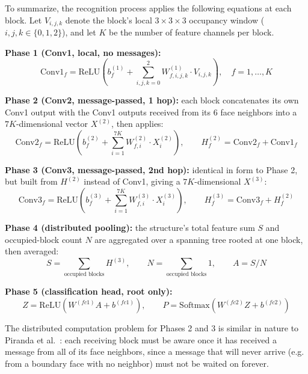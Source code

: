 \documentclass[12pt,a4paper]{report}
\begin{document}
To summarize, the recognition process applies the following equations at each block. Let $V_{i,j,k}$ denote the block's local $3\times3\times3$ occupancy window ($i,j,k \in \{0,1,2\}$), and let $K$ be the number of feature channels per block.

\textbf{Phase 1 (Conv1, local, no messages):}
\begin{equation}
\text{Conv1}_f = \mathrm{ReLU}\left(b^{(1)}_f + \sum_{i,j,k=0}^{2} W^{(1)}_{f,i,j,k} \cdot V_{i,j,k}\right), \quad f = 1,\dots,K
\label{eq:conv1}
\end{equation}

\textbf{Phase 2 (Conv2, message-passed, 1 hop):} each block concatenates its own Conv1 output with the Conv1 outputs received from its 6 face neighbors into a $7K$-dimensional vector $X^{(2)}$, then applies:
\begin{equation}
\text{Conv2}_f = \mathrm{ReLU}\left(b^{(2)}_f + \sum_{i=1}^{7K} W^{(2)}_{f,i} \cdot X^{(2)}_i\right), \qquad H^{(2)}_f = \text{Conv2}_f + \text{Conv1}_f
\label{eq:conv2}
\end{equation}

\textbf{Phase 3 (Conv3, message-passed, 2nd hop):} identical in form to Phase 2, but built from $H^{(2)}$ instead of Conv1, giving a $7K$-dimensional $X^{(3)}$:
\begin{equation}
\text{Conv3}_f = \mathrm{ReLU}\left(b^{(3)}_f + \sum_{i=1}^{7K} W^{(3)}_{f,i} \cdot X^{(3)}_i\right), \qquad H^{(3)}_f = \text{Conv3}_f + H^{(2)}_f
\label{eq:conv3}
\end{equation}

\textbf{Phase 4 (distributed pooling):} the structure's total feature sum $S$ and occupied-block count $N$ are aggregated over a spanning tree rooted at one block, then averaged:
\begin{equation}
S = \sum_{\text{occupied blocks}} H^{(3)}, \qquad N = \sum_{\text{occupied blocks}} 1, \qquad A = S / N
\label{eq:pool}
\end{equation}

\textbf{Phase 5 (classification head, root only):}
\begin{equation}
Z = \mathrm{ReLU}(W^{(fc1)} A + b^{(fc1)}), \qquad P = \mathrm{Softmax}(W^{(fc2)} Z + b^{(fc2)})
\label{eq:fc}
\end{equation}

The distributed computation problem for Phases 2 and 3 is similar in nature to Piranda et al.~\cite{piranda2024ai4pm}: each receiving block must be aware once it has received a message from all of its face neighbors, since a message that will never arrive (e.g. from a boundary face with no neighbor) must not be waited on forever.
\end{document}
